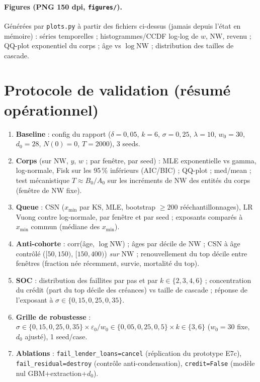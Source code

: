 \documentclass[11pt,a4paper]{article}
\newcommand{\NW}{\mathrm{NW}}
\newcommand{\code}[1]{\texttt{#1}}
\begin{document}
\paragraph{Figures (PNG 150 dpi, \code{figures/}).} Générées par
\code{plots.py} à partir des fichiers ci-dessus (jamais depuis l'état en
mémoire) : séries temporelles ; histogrammes/CCDF log-log de $w$, $\NW$,
revenu ; QQ-plot exponentiel du corps ; âge vs $\log \NW$ ; distribution des
tailles de cascade.

\section{Protocole de validation (résumé opérationnel)}
\begin{enumerate}[nosep]
\item \textbf{Baseline} : config du rapport ($\delta=0{,}05$, $k=6$,
  $\sigma=0{,}25$, $\lambda=10$, $w_0=30$, $d_0=28$, $N(0)=0$, $T=2000$),
  3 seeds.
\item \textbf{Corps} (sur $\NW$, $y$, $w$ ; par fenêtre, par seed) : MLE
  exponentielle vs gamma, log-normale, Fisk sur les 95\,\% inférieurs
  (AIC/BIC) ; QQ-plot ; med/mean ; test mécanistique $T \approx B_0/A_0$ sur
  les incréments de $\NW$ des entités du corps (fenêtre de $\NW$ fixe).
\item \textbf{Queue} : CSN ($x_{\min}$ par KS, MLE, bootstrap $\ge 200$
  rééchantillonnages), LR Vuong contre log-normale, par fenêtre et par
  seed ; exposants comparés à $x_{\min}$ commun (médiane des $x_{\min}$).
\item \textbf{Anti-cohorte} : corr(âge, $\log \NW$) ; âges par décile de
  $\NW$ ; CSN à âge contrôlé ($[50,150)$, $[150,400)$) \emph{sur $\NW$} ;
  renouvellement du top décile entre fenêtres (fraction née récemment,
  survie, mortalité du top).
\item \textbf{SOC} : distribution des faillites par pas et par $k \in
  \{2,3,4,6\}$ ; concentration du crédit (part du top décile des créances)
  vs taille de cascade ; réponse de l'exposant à
  $\sigma \in \{0{,}15, 0{,}25, 0{,}35\}$.
\item \textbf{Grille de robustesse} : $\sigma \in \{0{,}15,0{,}25,0{,}35\}
  \times \varepsilon_0/w_0 \in \{0{,}05,0{,}25,0{,}5\} \times k \in \{3,6\}$
  ($w_0 = 30$ fixe, $d_0$ ajusté), 1 seed/case.
\item \textbf{Ablations} : \code{fail\_lender\_loans=cancel} (réplication du
  prototype E7c), \code{fail\_residual=destroy} (contrôle anti-condensation),
  \code{credit=False} (modèle nul GBM+extraction+$d_0$).
\end{enumerate}
\end{document}

